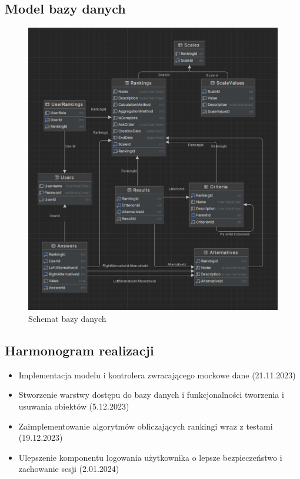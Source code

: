 \documentclass{article}
\begin{document}
\subsection{Model bazy danych}
\begin{figure}[h!]
    \centering
    \includegraphics[width=\linewidth]{db-diagram-vert.PNG}
    \caption{Schemat bazy danych}
\end{figure}

\pagebreak
\subsection{Harmonogram realizacji}
\begin{itemize}
    \item Implementacja modelu i kontrolera zwracającego mockowe dane (21.11.2023)
    \item Stworzenie warstwy dostępu do bazy danych i funkcjonalności tworzenia i usuwania obiektów (5.12.2023)
    \item Zaimplementowanie algorytmów obliczających rankingi wraz z testami (19.12.2023)
    \item Ulepszenie komponentu logowania użytkownika o lepsze bezpieczeństwo i zachowanie sesji (2.01.2024)
\end{itemize}
\end{document}
